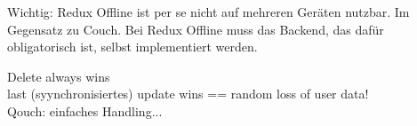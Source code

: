 
Wichtig: Redux Offline ist per se nicht auf mehreren Geräten nutzbar. Im Gegensatz zu Couch. Bei Redux Offline muss das Backend, das dafür obligatorisch ist, selbst implementiert werden.


%
Delete always wins\\
last (syynchronisiertes) update wins == random loss of user data!\\
Qouch: einfaches Handling...
